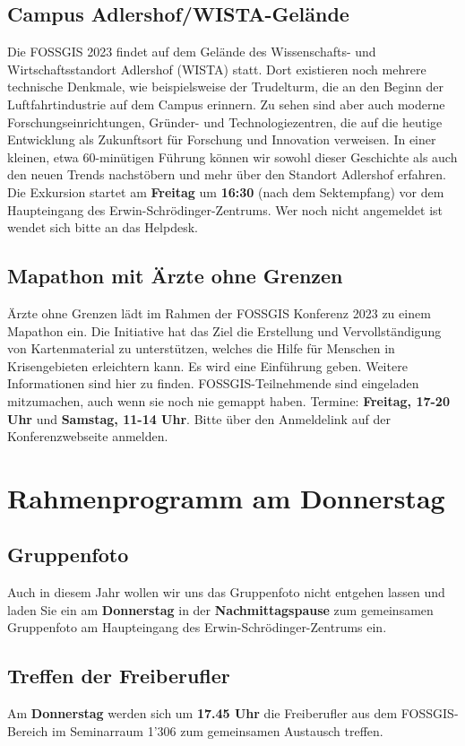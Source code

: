 \subsection*{Campus Adlershof/WISTA-Gelände}
Die FOSSGIS 2023 findet auf dem Gelände des Wissenschafts- und Wirtschaftsstandort Adlershof (WISTA) statt. Dort existieren noch mehrere technische Denkmale, wie beispielsweise der Trudelturm, die an den Beginn der Luftfahrtindustrie auf dem Campus erinnern. Zu sehen sind aber auch moderne Forschungseinrichtungen, Gründer- und Technologiezentren, die auf die heutige Entwicklung als Zukunftsort für Forschung und Innovation verweisen. In einer kleinen, etwa 60-minütigen Führung können wir sowohl dieser Geschichte als auch den neuen Trends nachstöbern und mehr über den Standort Adlershof erfahren.
Die Exkursion startet am {\bfseries Freitag} um {\bfseries 16:30} (nach dem Sektempfang) vor dem Haupteingang des Erwin-Schrödinger-Zentrums. Wer noch nicht angemeldet ist wendet sich bitte an das Helpdesk.
\subsection*{Mapathon mit Ärzte ohne Grenzen}
Ärzte ohne Grenzen lädt im Rahmen der FOSSGIS Konferenz 2023 zu einem Mapathon ein. Die Initiative hat das Ziel die Erstellung und Vervollständigung von Kartenmaterial zu unterstützen, welches die Hilfe für Menschen in Krisengebieten erleichtern kann. Es wird eine Einführung geben. Weitere Informationen sind hier zu finden. FOSSGIS-Teilnehmende sind eingeladen mitzumachen, auch wenn sie noch nie gemappt haben.
Termine: {\bfseries Freitag, 17-20 Uhr} und {\bfseries Samstag, 11-14 Uhr}. Bitte über den Anmeldelink auf der Konferenzwebseite anmelden.

\section*{Rahmenprogramm am Donnerstag}
\subsection*{Gruppenfoto}
Auch in diesem Jahr wollen wir uns das Gruppenfoto nicht entgehen lassen und laden Sie ein am {\bfseries Donnerstag} in der {\bfseries Nachmittagspause} zum gemeinsamen Gruppenfoto am Haupteingang des Erwin-Schrödinger-Zentrums ein.

\subsection*{Treffen der Freiberufler}
Am {\bfseries Donnerstag} werden sich um {\bfseries 17.45 Uhr} die Freiberufler aus dem FOSSGIS-Bereich im Seminarraum 1'306 zum gemeinsamen Austausch treffen.

